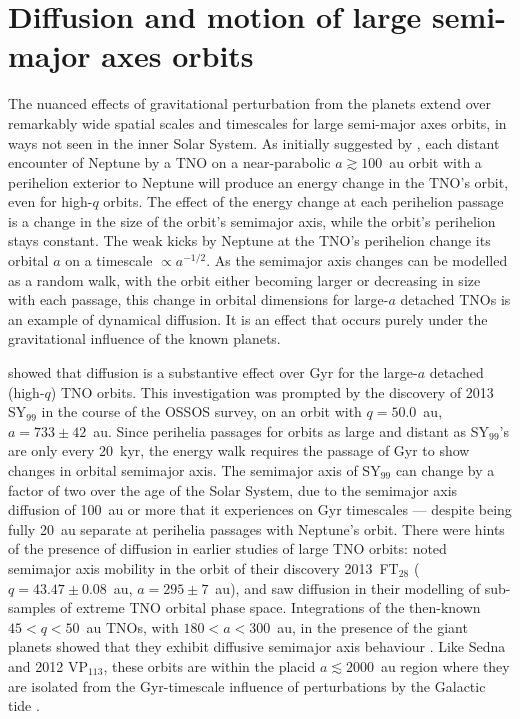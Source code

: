 \documentclass[preprint]{aastex62}
\begin{document}
\section{Diffusion and motion of large semi-major axes orbits} \label{sec:diffusion}

The nuanced effects of gravitational perturbation from the planets extend over remarkably wide spatial scales and timescales for large semi-major axes orbits, in ways not seen in the inner Solar System.
As initially suggested by \citet{Duncan1987}, each distant encounter of Neptune by a TNO on a near-parabolic $a \gtrsim 100$~au orbit with a perihelion exterior to Neptune will produce an energy change in the TNO's orbit, even for high-$q$ orbits. 
The effect of the energy change at each perihelion passage is a change in the size of the orbit's semimajor axis, while the orbit's perihelion stays constant.
The weak kicks by Neptune at the TNO's perihelion change its orbital $a$ on a timescale $\propto a^{-1/2}$.
As the semimajor axis changes can be modelled as a random walk, with the orbit either becoming larger or decreasing in size with each passage, this change in orbital dimensions for large-$a$ detached TNOs is an example of dynamical diffusion.
It is an effect that occurs purely under the gravitational influence of the known planets.

\citet{bannister17} showed that diffusion is a substantive effect over Gyr for the large-$a$ detached (high-$q$) TNO orbits.
This investigation was prompted by the discovery of 2013 SY$_{99}$ in the course of the OSSOS survey, on an orbit with $q = 50.0$~au, $a = 733 \pm 42$~au.
Since perihelia passages for orbits as large and distant as SY$_{99}$'s are only every 20~kyr, the energy walk requires the passage of Gyr to show changes in orbital semimajor axis.
The semimajor axis of SY$_{99}$ can change by a factor of two over the age of the Solar System, due to the semimajor axis diffusion of 100~au or more that it experiences on Gyr timescales --- despite being fully 20~au separate at perihelia passages with Neptune's orbit.
There were hints of the presence of diffusion in earlier studies of large TNO orbits: \citet{sheppardtrujillo16} noted semimajor axis mobility in the orbit of their discovery 2013~FT$_{28}$ ($q = 43.47 \pm 0.08$~au, $a = 295 \pm 7$~au), and \citet{gallardo12,brasserschwamb15} saw diffusion in their modelling of sub-samples of extreme TNO orbital phase space.
Integrations of the then-known $45<q<50$~au TNOs, with $180 < a < 300$~au, in the presence of the giant planets showed that they exhibit diffusive semimajor axis behaviour \citep{bannister17}. 
Like Sedna and 2012 VP$_{113}$, these orbits are within the placid $a \lesssim 2000$~au region where they are isolated from the Gyr-timescale influence of perturbations by the Galactic tide \citep{brasserschwamb15}.
\end{document}
